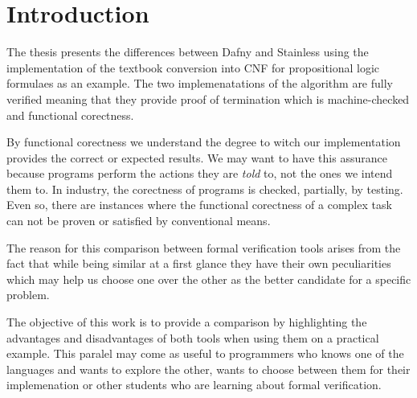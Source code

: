 \chapter*{Introduction} 


The thesis presents the differences between Dafny and Stainless using the
implementation of the textbook conversion into CNF for propositional logic formulaes as an example.
The two implemenatations of the algorithm are fully verified meaning that they provide
proof of termination which is machine-checked and functional corectness.

By functional corectness we understand the degree to witch our implementation provides
the correct or expected results. We may want to have this assurance because programs
perform the actions they are \textit{told} to, not the ones we intend them to.
In industry, the corectness of programs is checked, partially, by testing. Even so, there
are instances where the functional corectness of a complex task can not be proven or satisfied
by conventional means.

The reason for this comparison between formal verification tools arises from
the fact that while being similar at a first glance they have their own peculiarities
which may help us choose one over the other as the better candidate for a specific problem.




The objective of this work is to provide a comparison by highlighting the advantages 
and disadvantages of both tools when using them on a practical example. This paralel may
come as useful to programmers who knows one of the languages and wants to explore the other, 
wants to choose between them for their implemenation or other students who are learning  
about formal verification.
